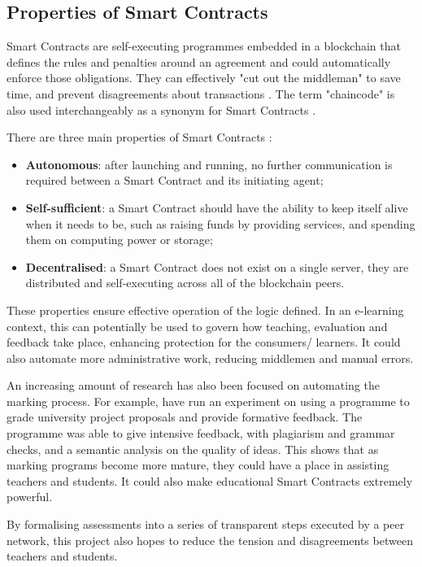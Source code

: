 \subsection{Properties of Smart Contracts}
Smart Contracts are self-executing programmes embedded in a blockchain that defines the rules and penalties around an agreement and
could automatically enforce those obligations. They can effectively "cut out the middleman" to save time, and prevent disagreements
about transactions \citep{gulhane2017ibm}. The term "chaincode" is also used interchangeably as a synonym for
Smart Contracts \citep[p.6]{valenta2017comparison}.

There are three main properties of Smart Contracts \citep[p.16]{swan2015blockchain}:

\begin{itemize}
	\setlength\itemsep{0em}
	\item \textbf{Autonomous}: after launching and running, no further communication is required between a Smart Contract
	      and its initiating agent;
	\item \textbf{Self-sufficient}: a Smart Contract should have the ability to keep itself alive when it needs to be,
	      such as raising funds by providing services, and spending them on computing power or storage;
	\item \textbf{Decentralised}: a Smart Contract does not exist on a single server, they are distributed and self-executing
	      across all of the blockchain peers.
\end{itemize}

These properties ensure effective operation of the logic defined. In an e-learning context, this can potentially
be used to govern how teaching, evaluation and feedback take place, enhancing protection for the consumers/ learners. 
It could also automate more administrative work, reducing middlemen and manual errors.

An increasing amount of research has also been focused on automating the marking process. For example, \citet{al2012auto} have run 
an experiment on using a programme to grade university project proposals and provide formative feedback. The programme was 
able to give intensive feedback, with plagiarism and grammar checks, and a semantic analysis on the quality of ideas.
This shows that as marking programs become more mature, they could have a place in assisting teachers and students. 
It could also make educational Smart Contracts extremely powerful.

By formalising assessments into a series of transparent steps executed by a peer network, this project also hopes to 
reduce the tension and disagreements between teachers and students.

